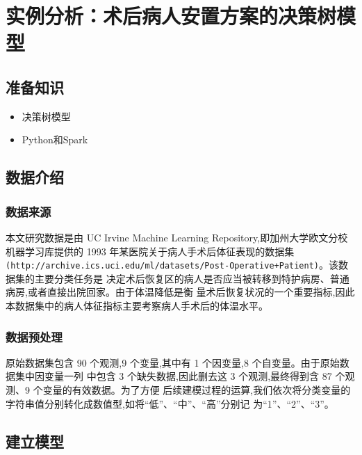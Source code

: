 \section{实例分析：术后病人安置方案的决策树模型}\label{ux5b9eux4f8bux5206ux6790ux672fux540eux75c5ux4ebaux5b89ux7f6eux65b9ux6848ux7684ux51b3ux7b56ux6811ux6a21ux578b}

\subsection{准备知识}\label{ux51c6ux5907ux77e5ux8bc6}

\begin{itemize}
\itemsep1pt\parskip0pt
\item
  决策树模型
\item
  Python和Spark
\end{itemize}

\subsection{数据介绍}\label{ux6570ux636eux4ecbux7ecd}

\subsubsection{数据来源}\label{ux6570ux636eux6765ux6e90}

本文研究数据是由 UC Irvine Machine Learning
Repository,即加州大学欧文分校机器学习库提供的 1993
年某医院关于病人手术后体征表现的数据集
\texttt{(http://archive.ics.uci.edu/ml/datasets/Post-Operative+Patient)}。该数据集的主要分类任务是
决定术后恢复区的病人是否应当被转移到特护病房、普通病房,或者直接出院回家。由于体温降低是衡
量术后恢复状况的一个重要指标,因此本数据集中的病人体征指标主要考察病人手术后的体温水平。

\subsubsection{数据预处理}\label{ux6570ux636eux9884ux5904ux7406}

原始数据集包含 90 个观测,9 个变量,其中有 1 个因变量,8
个自变量。由于原始数据集中因变量一列 中包含 3 个缺失数据,因此删去这 3
个观测,最终得到含 87 个观测、9 个变量的有效数据。为了方便
后续建模过程的运算,我们依次将分类变量的字符串值分别转化成数值型,如将“低”、“中”、“高”分别记
为“1”、“2”、“3”。

\subsection{建立模型}\label{ux5efaux7acbux6a21ux578b}

